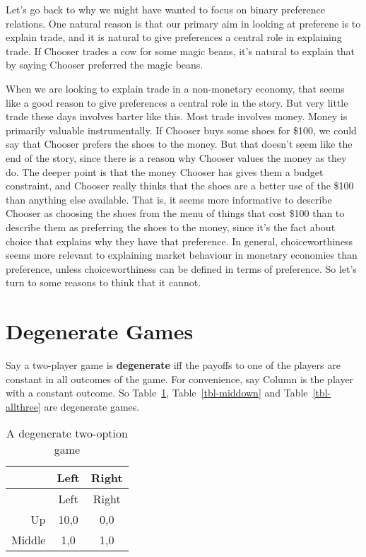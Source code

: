 \documentclass[
  11pt,
  letterpaper,
  DIV=11,
  numbers=noendperiod,
  twoside]{scrartcl}
\begin{document}
Let's go back to why we might have wanted to focus on binary preference
relations. One natural reason is that our primary aim in looking at
preferene is to explain trade, and it is natural to give preferences a
central role in explaining trade. If Chooser trades a cow for some magic
beans, it's natural to explain that by saying Chooser preferred the
magic beans.

When we are looking to explain trade in a non-monetary economy, that
seems like a good reason to give preferences a central role in the
story. But very little trade these days involves barter like this. Most
trade involves money. Money is primarily valuable instrumentally. If
Chooser buys some shoes for \$100, we could say that Chooser prefers the
shoes to the money. But that doesn't seem like the end of the story,
since there is a reason why Chooser values the money as they do. The
deeper point is that the money Chooser has gives them a budget
constraint, and Chooser really thinks that the shoes are a better use of
the \$100 than anything else available. That is, it seems more
informative to describe Chooser as choosing the shoes from the menu of
things that cost \$100 than to describe them as preferring the shoes to
the money, since it's the fact about choice that explains why they have
that preference. In general, choiceworthiness seems more relevant to
explaining market behaviour in monetary economies than preference,
unless choiceworthiness can be defined in terms of preference. So let's
turn to some reasons to think that it cannot.

\section{Degenerate Games}\label{sec-games}

Say a two-player game is \textbf{degenerate} iff the payoffs to one of
the players are constant in all outcomes of the game. For convenience,
say Column is the player with a constant outcome. So
Table~\ref{tbl-upmid}, Table~\ref{tbl-middown} and
Table~\ref{tbl-allthree} are degenerate games.

\begin{longtable}[]{@{}rcc@{}}
\caption{A degenerate two-option game}\label{tbl-upmid}\tabularnewline
\toprule\noalign{}
& Left & Right \\
\midrule\noalign{}
\endfirsthead
\toprule\noalign{}
& Left & Right \\
\midrule\noalign{}
\endhead
\bottomrule\noalign{}
\endlastfoot
Up & 10,0 & 0,0 \\
Middle & 1,0 & 1,0 \\
\end{longtable}
\end{document}
